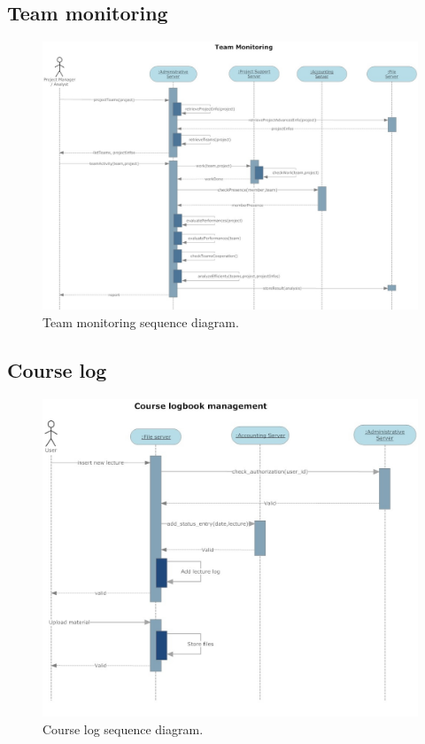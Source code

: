 \subsection{Team monitoring}
\begin{figure}
\begin{centering}
\includegraphics[scale=0.40,angle=90]{assign3/sdraw/imgs/team_monitoring.jpg}
\caption{Team monitoring sequence diagram.}
\label{3img:[sequence]team_monitoring}
\end{centering}
\end{figure}

\subsection{Course log}
\begin{figure}
\begin{centering}
\includegraphics[scale=0.45]{assign3/sdraw/imgs/course_log.jpg}
\caption{Course log sequence diagram.}
\label{3img:[sequence]course_log}
\end{centering}
\end{figure}

